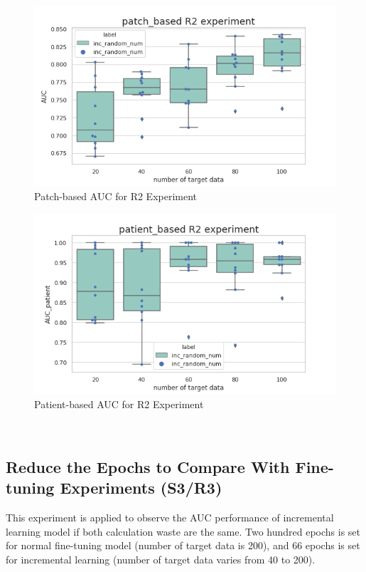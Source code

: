 ~\\
\begin{figure}[H]
    \hfil
    \begin{minipage}[t]{0.9\textwidth}
        \includegraphics[width=\textwidth]{fig/R2_num_patch.png}
        \caption{\label{fig:parallel1} Patch-based AUC for R2 Experiment}
    \end{minipage}
    \hfil
\end{figure}
\begin{figure}[H]
    \hfil
    \begin{minipage}[t]{0.9\textwidth}
        \includegraphics[width=\textwidth]{fig/R2_num_patient.png}
        \caption{\label{fig:parallel1}Patient-based AUC for R2 Experiment}
    \end{minipage}
    \hfil
\end{figure}
~\\

\subsection{Reduce the Epochs to Compare With Fine-tuning Experiments (S3/R3)}
This experiment is applied to observe the AUC performance of incremental learning model if both calculation waste are the same. Two hundred epochs is set for normal fine-tuning model (number of target data is 200), and 66 epochs is set for incremental learning (number of target data varies from 40 to 200). 


